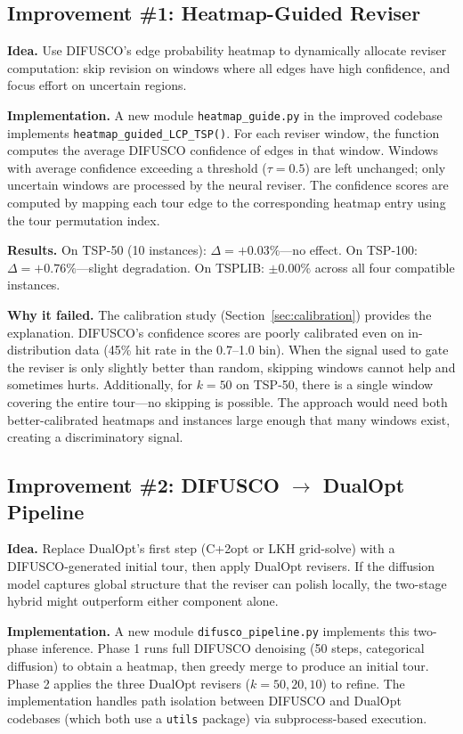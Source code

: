\documentclass[11pt,a4paper]{article}
\begin{document}
\subsection{Improvement \#1: Heatmap-Guided Reviser}
\label{sec:imp1}

\textbf{Idea.} Use DIFUSCO's edge probability heatmap to dynamically allocate reviser computation: skip revision on windows where all edges have high confidence, and focus effort on uncertain regions.

\textbf{Implementation.} A new module \texttt{heatmap\_guide.py} in the improved codebase implements \texttt{heatmap\_guided\_LCP\_TSP()}. For each reviser window, the function computes the average DIFUSCO confidence of edges in that window. Windows with average confidence exceeding a threshold ($\tau = 0.5$) are left unchanged; only uncertain windows are processed by the neural reviser. The confidence scores are computed by mapping each tour edge to the corresponding heatmap entry using the tour permutation index.

\textbf{Results.} On TSP-50 (10 instances): $\Delta = +0.03\%$---no effect. On TSP-100: $\Delta = +0.76\%$---slight degradation. On TSPLIB: $\pm 0.00\%$ across all four compatible instances.

\textbf{Why it failed.} The calibration study (Section~\ref{sec:calibration}) provides the explanation. DIFUSCO's confidence scores are poorly calibrated even on in-distribution data (45\% hit rate in the 0.7--1.0 bin). When the signal used to gate the reviser is only slightly better than random, skipping windows cannot help and sometimes hurts. Additionally, for $k=50$ on TSP-50, there is a single window covering the entire tour---no skipping is possible. The approach would need both better-calibrated heatmaps and instances large enough that many windows exist, creating a discriminatory signal.

\subsection{Improvement \#2: DIFUSCO $\rightarrow$ DualOpt Pipeline}
\label{sec:imp2}

\textbf{Idea.} Replace DualOpt's first step (C+2opt or LKH grid-solve) with a DIFUSCO-generated initial tour, then apply DualOpt revisers. If the diffusion model captures global structure that the reviser can polish locally, the two-stage hybrid might outperform either component alone.

\textbf{Implementation.} A new module \texttt{difusco\_pipeline.py} implements this two-phase inference. Phase 1 runs full DIFUSCO denoising (50 steps, categorical diffusion) to obtain a heatmap, then greedy merge to produce an initial tour. Phase 2 applies the three DualOpt revisers ($k=50,20,10$) to refine. The implementation handles path isolation between DIFUSCO and DualOpt codebases (which both use a \texttt{utils} package) via subprocess-based execution.
\end{document}
